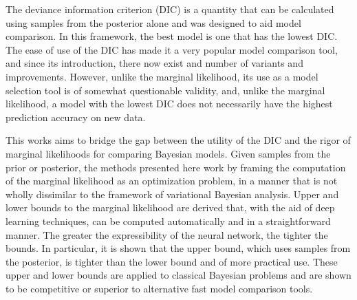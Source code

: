 \documentclass{article}
\begin{document}
The deviance information criterion (DIC) is a quantity that can be calculated using samples from the posterior alone and was designed to aid model comparison.
In this framework, the best model is one that has the lowest DIC. 
The ease of use of the DIC has made it a very popular model comparison tool, and since its introduction, there now exist and number of variants and improvements. 
However, unlike the marginal likelihood, its use as a model selection tool is of somewhat questionable validity, and, unlike the marginal likelihood, a model with the lowest DIC does not necessarily have the highest prediction accuracy on new data.

This works aims to bridge the gap between the utility of the DIC and the rigor of marginal likelihoods for comparing Bayesian models. Given samples from the prior or posterior, the methods presented here work by framing the computation of the marginal likelihood as an optimization problem, in a manner that is not wholly dissimilar to the framework of variational Bayesian analysis.
Upper and lower bounds to the marginal likelihood are derived that, with the aid of deep learning techniques, can be computed automatically and in a straightforward manner. 
The greater the expressibility of the neural network, the tighter the bounds.
In particular, it is shown that the upper bound, which uses samples from the posterior,  is tighter than the lower bound and of more practical use. These upper and lower bounds are applied to classical Bayesian problems and are shown to be competitive or superior to alternative fast model comparison tools. 
\end{document}
